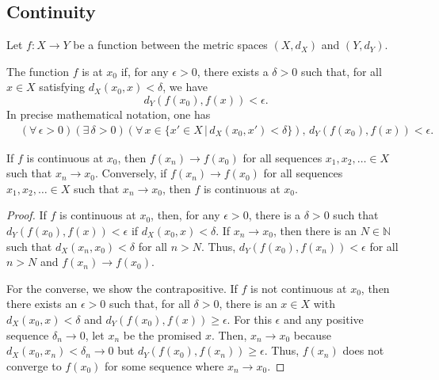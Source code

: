 \subsection{Continuity}

Let $f \colon X \rightarrow Y$ be a function between the metric spaces $(X,d_X)$ and $(Y,d_Y)$.

\begin{definition} \label{def:continuous_x0}
The function $f$ is  at $x_0$ if, for any $\epsilon> 0$, there exists a $\delta >0$ such that, for all $x\in X$ satisfying $d_X(x_0,x)< \delta$, we have 
\[ d_Y \left( f(x_0),f(x) \right) < \epsilon .\]
In precise mathematical notation, one has
\begin{equation*}
\begin{split}
&(\forall \, \epsilon >0) ( \exists \, \delta >0)(\forall \, x \in \{x'\in X\,|\,d_X (x_0,x')<\delta\}),  \, d_Y \left( f(x_0),f(x) \right) < \epsilon .
\end{split}
\end{equation*}
\end{definition}

\begin{theorem} \label{thm:cont_fun_limit}
If $f$ is continuous at $x_0$, then $f(x_n) \to f(x_0)$ for all sequences $x_1,x_2,\ldots \in X$ such that $x_n \to x_0$.
Conversely, if $f(x_n) \to f(x_0)$ for all sequences $x_1,x_2,\ldots  \in X$ such that $x_n \to x_0$, then $f$ is continuous at $x_0$.
\end{theorem}
\begin{proof}
If $f$ is continuous at $x_0$, then, for any $\epsilon > 0$, there is a $\delta >0$ such that $d_Y (f(x_0),f(x)) < \epsilon$ if $d_X (x_0,x) < \delta$.
If $x_n \to x_0$, then there is an $N\in \mathbb{N}$ such that $d_X (x_n,x_0) < \delta$ for all $n>N$.
Thus, $d_Y (f(x_0),f(x_n)) < \epsilon$ for all $n>N$ and $f(x_n) \to f(x_0)$.

For the converse, we show the contrapositive.
If $f$ is not continuous at $x_0$, then there exists an $\epsilon >0$ such that, for all $\delta >0$, there is an $x\in X$ with $d_X (x_0,x) < \delta$ and $d_Y (f(x_0),f(x))\geq \epsilon$.
For this $\epsilon$ and any positive sequence $\delta_n \to 0$, let $x_n$ be the promised $x$.
Then, $x_n \to x_0$ because $d_X (x_0,x_n)<\delta_n \to 0$ but $d_Y (f(x_0),f(x_n))\geq \epsilon$.
Thus, $f(x_n)$ does not converge to $f(x_0)$ for some sequence where $x_n \to x_0$.
\end{proof}

